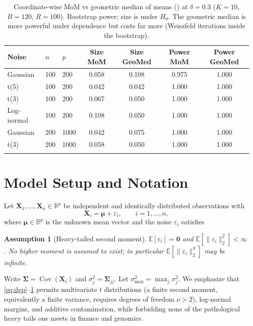 \documentclass[pdflatex,sn-mathphys-num]{sn-jnl}
\newcommand{\bX}{\mathbf{X}}
\newcommand{\bmu}{\boldsymbol{\mu}}
\newcommand{\bSig}{\boldsymbol{\Sigma}}
\newcommand{\bzero}{\mathbf{0}}
\newcommand{\R}{\mathbb{R}}
\newcommand{\E}{\mathbb{E}}
\newcommand{\Cov}{\operatorname{Cov}}
\newcommand{\normt}[1]{\lVert #1 \rVert_2}
\theoremstyle{thmstyleone}%
\theoremstyle{thmstyletwo}%
\theoremstyle{thmstylethree}%
\newtheorem{assumption}{Assumption}%
\begin{document}
\begin{table}[t]
\centering\small
\caption{Coordinate-wise MoM vs geometric median of means (\citet{minsker2015}) at $\delta=0.3$ ($K=10$, $B=120$, $R=100$). Bootstrap power; size is under $H_0$. The geometric median is more powerful under dependence but costs far more (Weiszfeld iterations inside the bootstrap).}
\label{tab:gm}
\begin{tabular}{lllcccc}
\toprule
Noise & $n$ & $p$ & Size MoM & Size GeoMed & Power MoM & Power GeoMed \\
\midrule
Gaussian & 100 & 200 & 0.058 & 0.108 & 0.975 & 1.000 \\
t(5) & 100 & 200 & 0.042 & 0.042 & 1.000 & 1.000 \\
t(3) & 100 & 200 & 0.067 & 0.050 & 1.000 & 1.000 \\
Log-normal & 100 & 200 & 0.108 & 0.050 & 1.000 & 1.000 \\
Gaussian & 200 & 1000 & 0.042 & 0.075 & 1.000 & 1.000 \\
t(3) & 200 & 1000 & 0.058 & 0.050 & 1.000 & 1.000 \\
\botrule
\end{tabular}
\end{table}

\section{Model Setup and Notation}
\label{sec:model}

Let $\bX_1,\dots,\bX_n\in\R^p$ be independent and identically distributed
observations with
\begin{equation}
\label{eq:dgp}
\bX_i = \bmu + \varepsilon_i,\qquad i=1,\dots,n,
\end{equation}
where $\bmu\in\R^p$ is the unknown mean vector and the noise
$\varepsilon_i$ satisfies
\begin{assumption}[Heavy-tailed second moment]
\label{as:ht}
$\E[\varepsilon_i]=\bzero$ and $\E[\normt{\varepsilon_i}^2]<\infty$.
No higher moment is assumed to exist; in particular
$\E[\normt{\varepsilon_i}^4]$ may be infinite.
\end{assumption}
Write $\bSig=\Cov(\bX_i)$ and $\sigma_j^2=\bSig_{jj}$. Let
$\sigma_{\max}^2=\max_j\sigma_j^2$.
We emphasize that \eqref{eq:dgp}--\ref{as:ht} permits multivariate
$t$ distributions (a finite second moment, equivalently a finite variance,
requires degrees of freedom $\nu>2$),
log-normal margins, and additive contamination, while forbidding none of the
pathological heavy tails one meets in finance and genomics.
\end{document}
